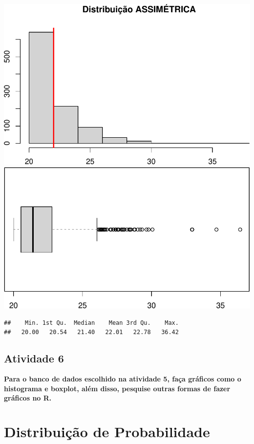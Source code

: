 \documentclass[
]{book}
\begin{document}
\includegraphics{Livro-Estatistica+R_files/figure-latex/unnamed-chunk-22-1.pdf} \includegraphics{Livro-Estatistica+R_files/figure-latex/unnamed-chunk-22-2.pdf}

\begin{verbatim}
##    Min. 1st Qu.  Median    Mean 3rd Qu.    Max. 
##   20.00   20.54   21.40   22.01   22.78   36.42
\end{verbatim}

\section{Atividade 6}\label{atividade-6}

\textbf{Para o banco de dados escolhido na atividade 5, faça gráficos como o histograma e boxplot, além disso, pesquise outras formas de fazer gráficos no R.}

\chapter{Distribuição de Probabilidade}\label{distribuiuxe7uxe3o-de-probabilidade}
\end{document}
